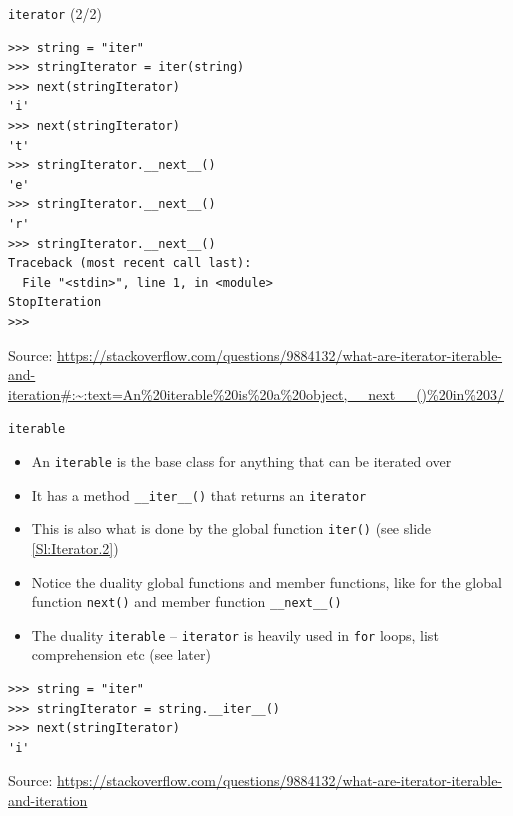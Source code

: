 \documentclass{beamer}
\begin{document}
\begin{frame}[fragile]
{\centerline{\texttt{iterator} (2/2)}}
\label{Sl:Iterator.2}
\begin{lstlisting}[style=myPythonStyle]
>>> string = "iter"
>>> stringIterator = iter(string)
>>> next(stringIterator)
'i'
>>> next(stringIterator)
't'
>>> stringIterator.__next__()
'e'
>>> stringIterator.__next__()
'r'
>>> stringIterator.__next__()
Traceback (most recent call last):
  File "<stdin>", line 1, in <module>
StopIteration
>>> 
\end{lstlisting}
\begin{center}
\tiny Source: \url{https://stackoverflow.com/questions/9884132/what-are-iterator-iterable-and-iteration#:~:text=An%20iterable%20is%20a%20object,__next__()%20in%203/}
\end{center}

\end{frame}

\begin{frame}[fragile]
{\centerline{\texttt{iterable}}}
\begin{itemize}
    \item An \texttt{iterable} is the base class for anything that can be iterated over
    \item It has a method \texttt{\_\_iter\_\_()} that returns an \texttt{iterator}  
    \item This is also what is done by the global function \texttt{iter()} (see slide \ref{Sl:Iterator.2})
    \item Notice the duality global functions and member functions, like for the global function \texttt{next()} and member function \texttt{\_\_next\_\_()}
    \item The duality \texttt{iterable} -- \texttt{iterator} is heavily used in \texttt{for} loops, list comprehension etc (see later)
 \end{itemize}
 \begin{lstlisting}[style=myPythonStyle]
>>> string = "iter"
>>> stringIterator = string.__iter__()
>>> next(stringIterator)
'i'
\end{lstlisting}

\begin{center}
\tiny Source: \url{https://stackoverflow.com/questions/9884132/what-are-iterator-iterable-and-iteration}
\end{center}

\end{frame}
\end{document}
